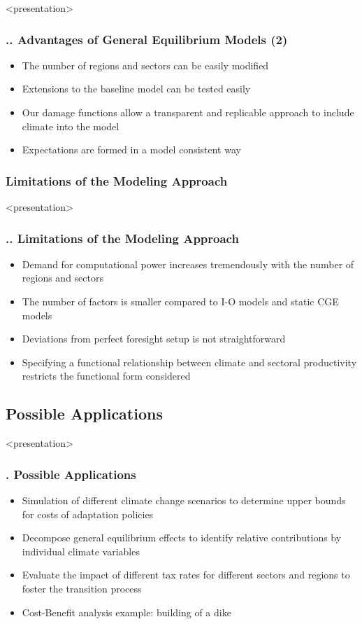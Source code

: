 \documentclass[11pt,aspectratio=169]{beamer}
\begin{document}
\begin{frame}<presentation>
	\frametitle{{\thesection.\thesubsection.\thesubsubsection}  Advantages of General Equilibrium Models (2)}
		\begin{itemize}
		\item The number of regions and sectors can be easily modified
		\item Extensions to the baseline model can be tested easily
		\item Our damage functions allow a transparent and replicable approach to include climate into the model
		\item Expectations are formed in a model consistent way
		\end{itemize}
\end{frame} 
	

	
	
\subsubsection{Limitations of the Modeling Approach}
\begin{frame}<presentation>
	\frametitle{{\thesection.\thesubsection.\thesubsubsection} Limitations of the Modeling Approach}
		\begin{itemize}
			\item Demand for computational power increases tremendously with the number of regions and sectors 
			\item The number of factors is smaller compared to I-O models and static CGE models
			\item Deviations from perfect foresight setup is not straightforward
			\item Specifying a functional relationship between climate and sectoral productivity restricts the functional form considered
		\end{itemize}
	\end{frame} 	
	
\subsection{Possible Applications}
\begin{frame}<presentation>
	\frametitle{{\thesection.\thesubsection} Possible Applications}
	\begin{itemize}
		\item Simulation of different climate change scenarios to determine upper bounds for costs of adaptation policies
		\item Decompose general equilibrium effects to identify relative contributions by individual climate variables
		\item Evaluate the impact of different tax rates for different sectors and regions to foster the transition process
		\item Cost-Benefit analysis example: building of a dike	
	\end{itemize}
\end{frame}
\end{document}
